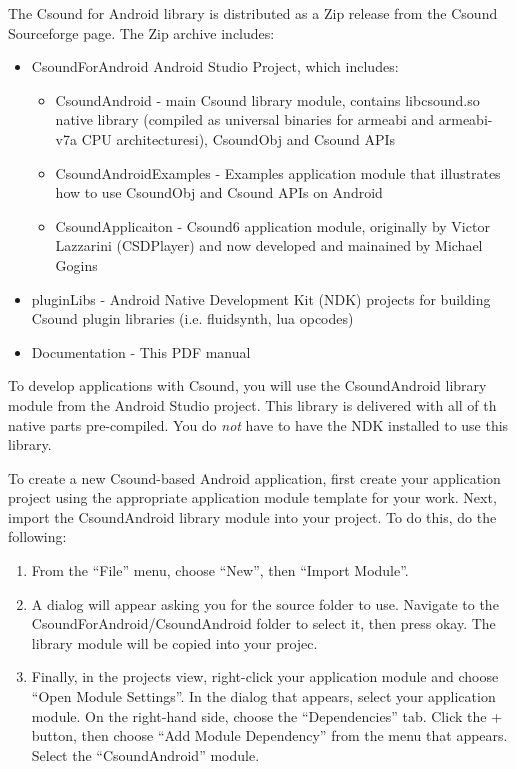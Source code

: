 \documentclass[11pt]{article}
\begin{document}
The Csound for Android library is distributed as a Zip release from the Csound Sourceforge page. The Zip archive includes:

\begin{itemize}
  \item CsoundForAndroid Android Studio Project, which includes:
  \begin{itemize}
  \item CsoundAndroid - main Csound library module, contains libcsound.so native library (compiled as universal binaries for armeabi and armeabi-v7a CPU architecturesi), CsoundObj and Csound APIs
  \item CsoundAndroidExamples - Examples application module that illustrates how to use CsoundObj and Csound APIs on Android
  \item CsoundApplicaiton - Csound6 application module, originally by Victor Lazzarini (CSDPlayer) and now developed and mainained by Michael Gogins
  \end{itemize}
  \item pluginLibs - Android Native Development Kit (NDK) projects for building Csound plugin libraries (i.e. fluidsynth, lua opcodes) 
  \item Documentation - This PDF manual
\end{itemize} 

To develop applications with Csound, you will use the CsoundAndroid library module from the Android Studio project.  This library is delivered with all of th native parts pre-compiled. You do \emph{not} have to have the NDK installed to use this library.  

To create a new Csound-based Android application, first create your application project using the appropriate application module template for your work. Next, import the CsoundAndroid library module into your project.  To do this, do the following:

\begin{enumerate}
\item From the ``File'' menu, choose ``New'', then ``Import Module''.
\item A dialog will appear asking you for the source folder to use.  Navigate to the CsoundForAndroid/CsoundAndroid folder to select it, then press okay.  The library module will be copied into your projec.   
\item Finally, in the projects view, right-click your application module and choose ``Open Module Settings''. In the dialog that appears, select your application module.  On the right-hand side, choose the ``Dependencies'' tab. Click the + button, then choose ``Add Module Dependency'' from the menu that appears.  Select the ``CsoundAndroid'' module.
\end{enumerate}
\end{document}
